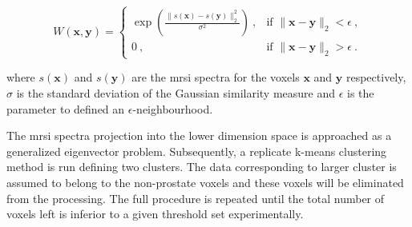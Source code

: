 \begin{equation}
	W(\mathbf{x},\mathbf{y}) =
	\begin{cases}	
	 	\exp \left( \frac{\| s(\mathbf{x}) - s(\mathbf{y}) \|_2^2}{\sigma^2} \right) \ , & \text{if } \| \mathbf{x} - \mathbf{y} \|_2 < \epsilon \ , \\
	 	0 \ , & \text{if } \| \mathbf{x} - \mathbf{y} \|_2 > \epsilon \ .
	 \end{cases}
	\label{eq:ge1}
\end{equation}

\noindent where $s(\mathbf{x})$ and $s(\mathbf{y})$ are the \ac{mrsi} spectra for the voxels $\mathbf{x}$ and $\mathbf{y}$ respectively, $\sigma$ is the standard deviation of the Gaussian similarity measure and $\epsilon$ is the parameter to defined an $\epsilon$-neighbourhood.

The \ac{mrsi} spectra projection into the lower dimension space is approached as a generalized eigenvector problem.
Subsequently, a replicate k-means clustering method is run defining two clusters.
The data corresponding to larger cluster is assumed to belong to the non-prostate voxels and these voxels will be eliminated from the processing.
The full procedure is repeated until the total number of voxels left is inferior to a given threshold set experimentally.




